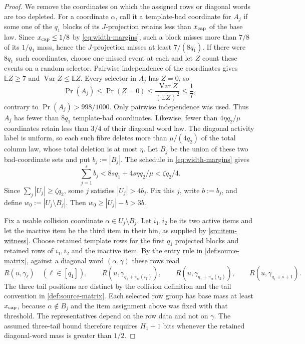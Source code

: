 \documentclass[11pt]{article} \usepackage[utf8]{inputenc}
\theoremstyle{plain} \newtheorem{theorem}{Theorem}[section]
\theoremstyle{definition} \newaliascnt{definition}{theorem}
\begin{document}
\begin{proof}
We remove the coordinates on which the assigned rows or diagonal words are too
depleted. For a coordinate \(\alpha\), call it a template-bad coordinate for
\(A_j\) if some one of the \(q_1\) blocks of its \(J\)-projection retains less
than \(x_{\rm cap}\) of the base law. Since \(x_{\rm cap}\le1/8\) by
\eqref{eq:width-margins}, such a block misses more than \(7/8\) of its \(1/q_1\)
mass, hence the \(J\)-projection misses at least \(7/(8q_1)\).
If there were $8q_1$ such coordinates, choose one missed event at each
and let $Z$ count these events on a random selector. Pairwise independence
of the coordinates gives $\mathbb EZ\ge7$ and
$\operatorname{Var}Z\le\mathbb EZ$. Every selector in $A_j$ has $Z=0$, so
\[
\Pr(A_j)\le\Pr(Z=0)\le
\frac{\operatorname{Var}Z}{(\mathbb EZ)^2}\le\frac17,
\]
contrary to $\Pr(A_j)>998/1000$. Only pairwise independence was used.
Thus \(A_j\) has
fewer than \(8q_1\) template-bad coordinates. Likewise, fewer than \(4\eta
q_2/\mu\) coordinates retain less than \(3/4\) of their diagonal word law.
The diagonal activity label is uniform, so each such fibre deletes more than
\(\mu/(4q_2)\) of the total column law, whose total deletion is at most
\(\eta\). Let \(B_j\) be the union of these two
bad-coordinate sets and put \(b_j:=|B_j|\). The schedule in
\eqref{eq:width-margins} gives
\[
\sum_{j=1}^s b_j<8sq_1+4s\eta q_2/\mu<\zeta q_2/4.
\]
Since \(\sum_j|U_j|\ge\zeta q_2\), some \(j\) satisfies \(|U_j|>4b_j\). Fix this
\(j\), write \(b:=b_j\), and define \(w_0:=|U_j\setminus B_j|\). Then
\(w_0\ge|U_j|-b>3b\).

Fix a usable collision coordinate \(\alpha\in U_j\setminus B_j\). Let
\(i_1,i_2\) be its two active items and let the inactive item be the third item
in their bin, as supplied by \cref{src:item-witness}. Choose retained template
rows for the first \(q_1\) projected blocks and retained rows of \(i_1,i_2\) and
the inactive item. By the entry rule in \cref{def:source-matrix}, against a
diagonal word \((\alpha,\gamma)\) these rows read
\[
R(u,\gamma_\ell)\quad(\ell\in[q_1]),\qquad
R(u,\gamma_{q_1+\pi_\alpha(i_1)}),\qquad
R(u,\gamma_{q_1+\pi_\alpha(i_2)}),\qquad R(u,\gamma_{q_1+s+1}).
\]
The three tail positions are distinct by the collision definition and the tail
convention in \cref{def:source-matrix}. Each selected row group has base mass at
least \(x_{\rm cap}\), because \(\alpha\notin B_j\) and the item assignment
above was fixed with that threshold. The representatives depend on the row data
and not on \(\gamma\). The assumed three-tail bound therefore requires \(H_1+1\) bits
whenever the retained diagonal-word mass is greater than \(1/2\).


\end{proof}
\end{document}
